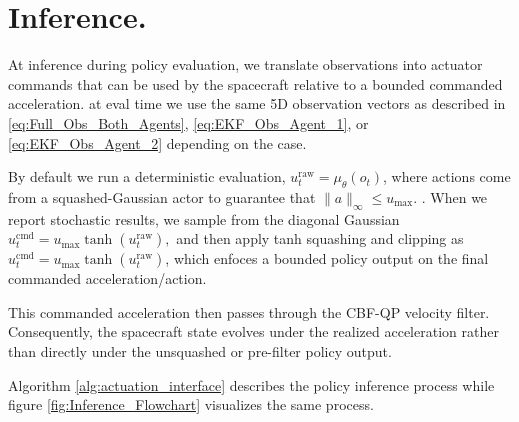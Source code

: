 \section{Inference.}
At inference during policy evaluation, we translate observations into actuator commands that can be used by the spacecraft relative to a bounded commanded acceleration. at eval time we use the same 5D observation vectors as described in \ref{eq:Full_Obs_Both_Agents}, \ref{eq:EKF_Obs_Agent_1}, or \ref{eq:EKF_Obs_Agent_2} depending on the case.

By default we run a deterministic evaluation, \(u_t^{\mathrm{raw}}=\mu_\theta(o_t)\), where
actions come from a squashed-Gaussian actor to guarantee that \(\|a\|_\infty \le u_{\max}\).
. When we report stochastic results, we sample from the diagonal Gaussian $
u_t^{\mathrm{cmd}}=u_{\max}\tanh\!\left(u_t^{\mathrm{raw}}\right),
$ and then apply tanh squashing and clipping as $u_t^{\mathrm{cmd}}=u_{\max}\tanh\!\left(u_t^{\mathrm{raw}}\right)$, which enfoces a bounded policy output on the final commanded acceleration/action.

This commanded acceleration then passes through the CBF-QP velocity filter. Consequently, the spacecraft state evolves under the realized acceleration rather than directly under the unsquashed or pre-filter policy output.

 Algorithm \ref{alg:actuation_interface} describes the policy inference process while figure \ref{fig:Inference_Flowchart} visualizes the same process.

